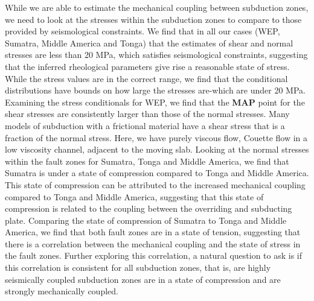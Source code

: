 \documentclass[12pt]{article}
\begin{document}
{   
   While we are able to estimate the mechanical coupling between subduction zones, we need to look at the stresses within the subduction zones to compare to those provided by seismological constraints. We find that in all our cases (WEP, Sumatra, Middle America and Tonga) that the estimates of shear and normal stresses are less than 20 MPa, which satisfies seismological constraints, suggesting that the inferred rheological parameters give rise a reasonable state of stress. While the stress values are in the correct range, we find that the conditional distributions have bounds on how large the stresses are-which are under 20 MPa. Examining the stress conditionals for WEP, we find that the \textbf{MAP} point for the shear stresses are consistently larger than those of the normal stresses. 
Many models of subduction with a frictional material have a shear stress that is a fraction of the normal stress.
Here, we have purely viscous flow, Couette flow in a low viscosity  channel, adjacent to the  moving slab. Looking at the normal stresses within the fault zones for Sumatra, Tonga and Middle America, we find that Sumatra is under a state of compression compared to Tonga and Middle America. This state of compression can be attributed to the increased mechanical coupling compared to Tonga and Middle America, suggesting that this state of compression is related to the coupling between the overriding and subducting plate. Comparing the state of compression of Sumatra to Tonga and Middle America, we find that both fault zones are in a state of tension, suggesting that there is a correlation between the mechanical coupling and the state of stress in the fault zones. Further exploring this correlation, a natural question to ask is if this correlation is consistent for all subduction zones, that is, are highly seismically coupled subduction zones are in a state of compression and are strongly mechanically coupled.
   
}
\end{document}
